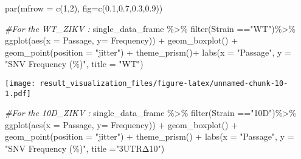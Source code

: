 \documentclass[
]{article}
\newenvironment{Shaded}{\begin{snugshade}}{\end{snugshade}}
\newcommand{\AttributeTok}[1]{\textcolor[rgb]{0.77,0.63,0.00}{#1}}
\newcommand{\CommentTok}[1]{\textcolor[rgb]{0.56,0.35,0.01}{\textit{#1}}}
\newcommand{\DecValTok}[1]{\textcolor[rgb]{0.00,0.00,0.81}{#1}}
\newcommand{\FloatTok}[1]{\textcolor[rgb]{0.00,0.00,0.81}{#1}}
\newcommand{\FunctionTok}[1]{\textcolor[rgb]{0.00,0.00,0.00}{#1}}
\newcommand{\NormalTok}[1]{#1}
\newcommand{\SpecialCharTok}[1]{\textcolor[rgb]{0.00,0.00,0.00}{#1}}
\newcommand{\StringTok}[1]{\textcolor[rgb]{0.31,0.60,0.02}{#1}}
\begin{document}
\begin{Shaded}
\begin{Highlighting}[]
\FunctionTok{par}\NormalTok{(}\AttributeTok{mfrow =} \FunctionTok{c}\NormalTok{(}\DecValTok{1}\NormalTok{,}\DecValTok{2}\NormalTok{), }\AttributeTok{fig=}\FunctionTok{c}\NormalTok{(}\FloatTok{0.1}\NormalTok{,}\FloatTok{0.7}\NormalTok{,}\FloatTok{0.3}\NormalTok{,}\FloatTok{0.9}\NormalTok{)) }

\CommentTok{\#For the WT\_ZIKV :}
\NormalTok{single\_data\_frame }\SpecialCharTok{\%\textgreater{}\%}
  \FunctionTok{filter}\NormalTok{(Strain }\SpecialCharTok{==}\StringTok{"WT"}\NormalTok{)}\SpecialCharTok{\%\textgreater{}\%}
  \FunctionTok{ggplot}\NormalTok{(}\FunctionTok{aes}\NormalTok{(}\AttributeTok{x =}\NormalTok{ Passage, }\AttributeTok{y=}\NormalTok{ Frequency)) }\SpecialCharTok{+} 
  \FunctionTok{geom\_boxplot}\NormalTok{() }\SpecialCharTok{+} 
  \FunctionTok{geom\_point}\NormalTok{(}\AttributeTok{position =} \StringTok{"jitter"}\NormalTok{) }\SpecialCharTok{+}
  \FunctionTok{theme\_prism}\NormalTok{()}\SpecialCharTok{+}
  \FunctionTok{labs}\NormalTok{(}\AttributeTok{x =} \StringTok{"Passage"}\NormalTok{, }\AttributeTok{y =} \StringTok{"SNV Frequency (\%)"}\NormalTok{, }\AttributeTok{title =} \StringTok{"WT"}\NormalTok{)}
\end{Highlighting}
\end{Shaded}

\texttt{[image: result\_visualization\_files/figure-latex/unnamed-chunk-10-1.pdf]}

\begin{Shaded}
\begin{Highlighting}[]
\CommentTok{\#For the 10D\_ZIKV :}
\NormalTok{single\_data\_frame }\SpecialCharTok{\%\textgreater{}\%}
  \FunctionTok{filter}\NormalTok{(Strain }\SpecialCharTok{==}\StringTok{"10D"}\NormalTok{)}\SpecialCharTok{\%\textgreater{}\%}
  \FunctionTok{ggplot}\NormalTok{(}\FunctionTok{aes}\NormalTok{(}\AttributeTok{x =}\NormalTok{ Passage, }\AttributeTok{y=}\NormalTok{ Frequency)) }\SpecialCharTok{+} 
  \FunctionTok{geom\_boxplot}\NormalTok{() }\SpecialCharTok{+} 
  \FunctionTok{geom\_point}\NormalTok{(}\AttributeTok{position =} \StringTok{"jitter"}\NormalTok{) }\SpecialCharTok{+}
  \FunctionTok{theme\_prism}\NormalTok{() }\SpecialCharTok{+}
  \FunctionTok{labs}\NormalTok{(}\AttributeTok{x =} \StringTok{"Passage"}\NormalTok{, }\AttributeTok{y =} \StringTok{"SNV Frequency (\%)"}\NormalTok{, }\AttributeTok{title =}\StringTok{"3\textquotesingle{}UTRΔ10"}\NormalTok{)}
\end{Highlighting}
\end{Shaded}
\end{document}
